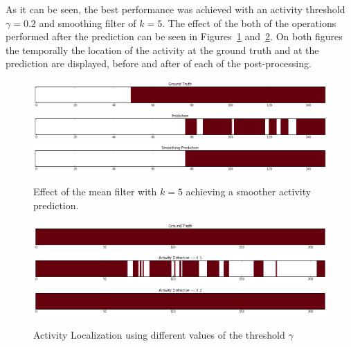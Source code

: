 As it can be seen, the best performance was achieved with an activity threshold $\gamma=0.2$ and smoothing filter of $k=5$. The effect of the both of the operations performed after the prediction can be seen in Figures~\ref{fig:smoothing_effect} and~\ref{fig:activty_threshold_effect}. On both figures the temporally the location of the activity at the ground truth and at the prediction are displayed, before and after of each of the post-processing.

\begin{figure}[ht]
\begin{center}
\includegraphics[width=1\linewidth]{img/results/smoothing_effect_4}
\includegraphics[width=1\linewidth]{img/results/smoothing_effect_5}
\includegraphics[width=1\linewidth]{img/results/smoothing_effect_6}
\end{center}
\caption{Effect of the mean filter with $k=5$ achieving a smoother activity prediction.}
\label{fig:smoothing_effect}
\end{figure}

\begin{figure}[ht]
\begin{center}
\includegraphics[width=1\linewidth]{img/results/activity_threshold_effect_1}
\includegraphics[width=1\linewidth]{img/results/activity_threshold_effect_2}
\includegraphics[width=1\linewidth]{img/results/activity_threshold_effect_3}
\end{center}
\caption{Activity Localization using different values of the threshold $\gamma$}
\label{fig:activty_threshold_effect}
\end{figure}

